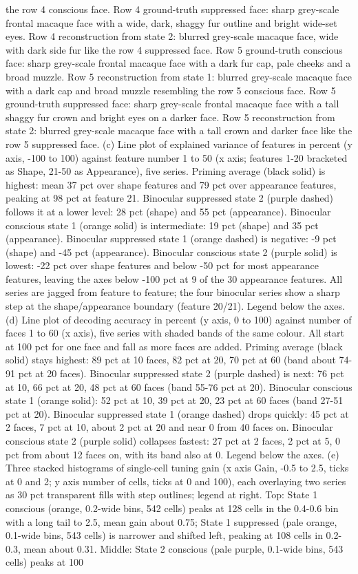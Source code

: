 \documentclass{article}
\begin{document}
the row 4 conscious face. Row 4 ground-truth suppressed face: sharp grey-scale frontal macaque face with a wide, dark, shaggy fur outline and bright wide-set eyes. Row 4 reconstruction from state 2: blurred grey-scale macaque face, wide with dark side fur like the row 4 suppressed face. Row 5 ground-truth conscious face: sharp grey-scale frontal macaque face with a dark fur cap, pale cheeks and a broad muzzle. Row 5 reconstruction from state 1: blurred grey-scale macaque face with a dark cap and broad muzzle resembling the row 5 conscious face. Row 5 ground-truth suppressed face: sharp grey-scale frontal macaque face with a tall shaggy fur crown and bright eyes on a darker face. Row 5 reconstruction from state 2: blurred grey-scale macaque face with a tall crown and darker face like the row 5 suppressed face. (c) Line plot of explained variance of features in percent (y axis, -100 to 100) against feature number 1 to 50 (x axis; features 1-20 bracketed as Shape, 21-50 as Appearance), five series. Priming average (black solid) is highest: mean 37 pct over shape features and 79 pct over appearance features, peaking at 98 pct at feature 21. Binocular suppressed state 2 (purple dashed) follows it at a lower level: 28 pct (shape) and 55 pct (appearance). Binocular conscious state 1 (orange solid) is intermediate: 19 pct (shape) and 35 pct (appearance). Binocular suppressed state 1 (orange dashed) is negative: -9 pct (shape) and -45 pct (appearance). Binocular conscious state 2 (purple solid) is lowest: -22 pct over shape features and below -50 pct for most appearance features, leaving the axes below -100 pct at 9 of the 30 appearance features. All series are jagged from feature to feature; the four binocular series show a sharp step at the shape/appearance boundary (feature 20/21). Legend below the axes. (d) Line plot of decoding accuracy in percent (y axis, 0 to 100) against number of faces 1 to 60 (x axis), five series with shaded bands of the same colour. All start at 100 pct for one face and fall as more faces are added. Priming average (black solid) stays highest: 89 pct at 10 faces, 82 pct at 20, 70 pct at 60 (band about 74-91 pct at 20 faces). Binocular suppressed state 2 (purple dashed) is next: 76 pct at 10, 66 pct at 20, 48 pct at 60 faces (band 55-76 pct at 20). Binocular conscious state 1 (orange solid): 52 pct at 10, 39 pct at 20, 23 pct at 60 faces (band 27-51 pct at 20). Binocular suppressed state 1 (orange dashed) drops quickly: 45 pct at 2 faces, 7 pct at 10, about 2 pct at 20 and near 0 from 40 faces on. Binocular conscious state 2 (purple solid) collapses fastest: 27 pct at 2 faces, 2 pct at 5, 0 pct from about 12 faces on, with its band also at 0. Legend below the axes. (e) Three stacked histograms of single-cell tuning gain (x axis Gain, -0.5 to 2.5, ticks at 0 and 2; y axis number of cells, ticks at 0 and 100), each overlaying two series as 30 pct transparent fills with step outlines; legend at right. Top: State 1 conscious (orange, 0.2-wide bins, 542 cells) peaks at 128 cells in the 0.4-0.6 bin with a long tail to 2.5, mean gain about 0.75; State 1 suppressed (pale orange, 0.1-wide bins, 543 cells) is narrower and shifted left, peaking at 108 cells in 0.2-0.3, mean about 0.31. Middle: State 2 conscious (pale purple, 0.1-wide bins, 543 cells) peaks at 100 
\end{document}
